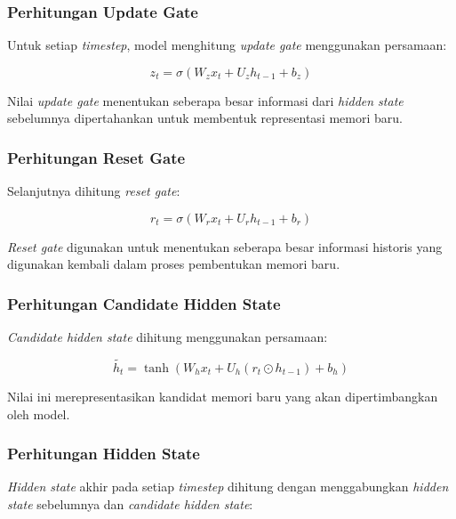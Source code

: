 \subsubsection{Perhitungan Update Gate}

Untuk setiap \textit{timestep}, model menghitung \textit{update gate} menggunakan persamaan:

\begin{equation}
z_t=\sigma(W_zx_t+U_zh_{t-1}+b_z)
\end{equation}

Nilai \textit{update gate} menentukan seberapa besar informasi dari \textit{hidden state} sebelumnya dipertahankan untuk membentuk representasi memori baru.

\subsubsection{Perhitungan Reset Gate}

Selanjutnya dihitung \textit{reset gate}:

\begin{equation}
r_t=\sigma(W_rx_t+U_rh_{t-1}+b_r)
\end{equation}

\textit{Reset gate} digunakan untuk menentukan seberapa besar informasi historis yang digunakan kembali dalam proses pembentukan memori baru.

\subsubsection{Perhitungan Candidate Hidden State}

\textit{Candidate hidden state} dihitung menggunakan persamaan:

\begin{equation}
\tilde{h_t}
=
\tanh
\left(
W_hx_t
+
U_h(r_t \odot h_{t-1})
+
b_h
\right)
\end{equation}

Nilai ini merepresentasikan kandidat memori baru yang akan dipertimbangkan oleh model.

\subsubsection{Perhitungan Hidden State}

\textit{Hidden state} akhir pada setiap \textit{timestep} dihitung dengan menggabungkan \textit{hidden state} sebelumnya dan \textit{candidate hidden state}:

